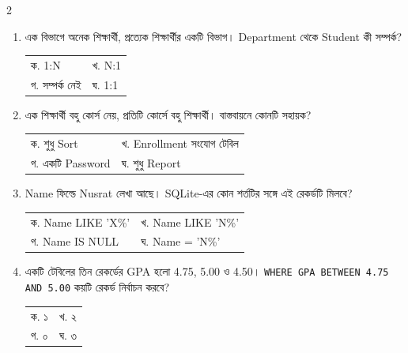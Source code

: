 \begin{multicols}{2}
\begin{enumerate}[resume]
\item \begin{minipage}[t]{\linewidth}
এক বিভাগে অনেক শিক্ষার্থী, প্রত্যেক শিক্ষার্থীর একটি বিভাগ। Department থেকে Student কী সম্পর্ক?
\par
\begin{tabularx}{\linewidth}{@{}X X@{}}
ক. 1:N & খ. N:1 \\
গ. সম্পর্ক নেই & ঘ. 1:1 \\
\end{tabularx}
\end{minipage}
\vspace{1pt}

\item \begin{minipage}[t]{\linewidth}
এক শিক্ষার্থী বহু কোর্স নেয়, প্রতিটি কোর্সে বহু শিক্ষার্থী। বাস্তবায়নে কোনটি সহায়ক?
\par
\begin{tabularx}{\linewidth}{@{}X X@{}}
ক. শুধু Sort & খ. Enrollment সংযোগ টেবিল \\
গ. একটি Password & ঘ. শুধু Report \\
\end{tabularx}
\end{minipage}
\vspace{1pt}

\item \begin{minipage}[t]{\linewidth}
Name ফিল্ডে Nusrat লেখা আছে। SQLite-এর কোন শর্তটির সঙ্গে এই রেকর্ডটি মিলবে?
\par
\begin{tabularx}{\linewidth}{@{}X X@{}}
ক. Name LIKE 'X\%' & খ. Name LIKE 'N\%' \\
গ. Name IS NULL & ঘ. Name = 'N\%' \\
\end{tabularx}
\end{minipage}
\vspace{1pt}

\item \begin{minipage}[t]{\linewidth}
একটি টেবিলের তিন রেকর্ডের GPA হলো 4.75, 5.00 ও 4.50। \texttt{WHERE GPA BETWEEN 4.75 AND 5.00} কয়টি রেকর্ড নির্বাচন করবে?
\par
\begin{tabularx}{\linewidth}{@{}X X@{}}
ক. ১ & খ. ২ \\
গ. ০ & ঘ. ৩ \\
\end{tabularx}
\end{minipage}
\vspace{1pt}


\end{enumerate}
\end{multicols}
